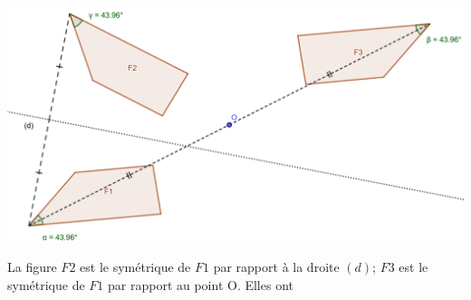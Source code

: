 \documentclass[12pt,a4paper]{article}
\begin{document}
\begin{myex}
	\begin{center}
		\includegraphics[scale=0.2]{sym_figures}
	\end{center}
	
	La figure $F2$ est le symétrique de $F1$ par rapport à la droite $(d)$; $F3$ est le symétrique de $F1$ par rapport au point O.
	Elles ont \\
\end{myex}
\end{document}
